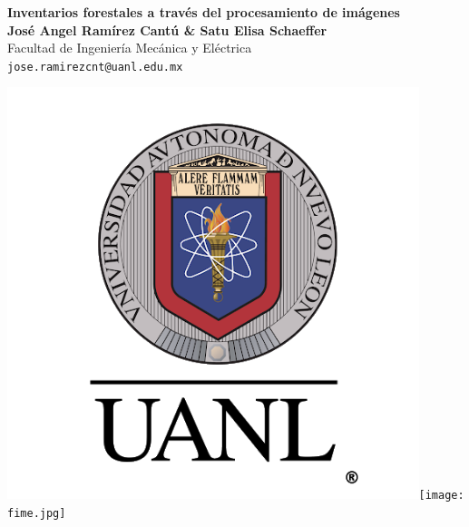 \documentclass[a0,portrait]{a0poster}
\begin{document}


\begin{minipage}[b]{1\linewidth}
\centering \veryHuge \color{Black} \textbf{Inventarios forestales a través del procesamiento de imágenes}\\ %
\huge \textbf{José Angel Ramírez Cantú \& Satu Elisa Schaeffer}\\[0.5cm] %
\huge Facultad de Ingeniería Mecánica y Eléctrica\\[0.4cm] %
\Large \texttt{jose.ramirezcnt@uanl.edu.mx}\\
\end{minipage}
%
\begin{minipage}[b]{0.25\linewidth}
\vspace*{-70mm}
\hspace*{15mm}
\includegraphics[width=12cm]{uanl.png}\hspace*{480mm}\texttt{[image: fime.jpg]}
\end{minipage}
\end{document}
